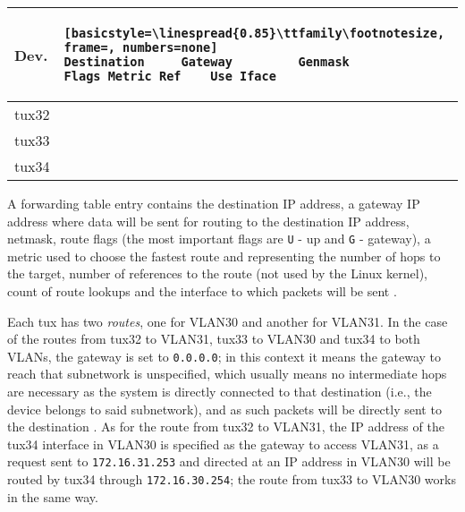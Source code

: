 \documentclass[a4paper, 11pt]{report}
\begin{document}
\begin{center}
    \small
    \begin{tabular}{l | l}
        \textbf{Dev.} & \begin{lstlisting}[basicstyle=\linespread{0.85}\ttfamily\footnotesize, frame=, numbers=none]
Destination     Gateway         Genmask         Flags Metric Ref    Use Iface
            \end{lstlisting} \\ \hline
        tux32 &  \\ \hline
        tux33 &  \\ \hline
        tux34 & 
    \end{tabular}
\end{center}

A forwarding table entry contains the destination IP address, a gateway IP address where data will be sent for routing to the destination IP address, netmask, route flags (the most important flags are \texttt{U} - up and \texttt{G} - gateway), a metric used to choose the fastest route and representing the number of hops to the target, number of references to the route (not used by the Linux kernel), count of route lookups and the interface to which packets will be sent \cite{man-route}.

Each tux has two \textit{routes}, one for VLAN30 and another for VLAN31.
In the case of the routes from tux32 to VLAN31, tux33 to VLAN30 and tux34 to both VLANs, the gateway is set to \texttt{0.0.0.0}; in this context it means the gateway to reach that subnetwork is unspecified, which usually means no intermediate hops are necessary as the system is directly connected to that destination (i.e., the device belongs to said subnetwork), and as such packets will be directly sent to the destination \cite{routing-basics}.
As for the route from tux32 to VLAN31, the IP address of the tux34 interface in VLAN30 is specified as the gateway to access VLAN31, as a request sent to \texttt{172.16.31.253} and directed at an IP address in VLAN30 will be routed by tux34 through \texttt{172.16.30.254}; the route from tux33 to VLAN30 works in the same way. 
\end{document}
